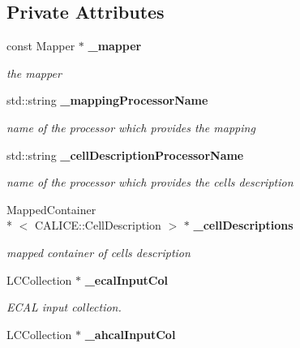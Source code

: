 \subsection*{Private Attributes}
\begin{DoxyCompactItemize}
\item 
const Mapper $\ast$ {\bf \-\_\-mapper}\label{classCALICE_1_1MipTrackFinder_af8ea6a3ae97f2df24592e914ff613203}

\begin{DoxyCompactList}\small\item\em the mapper \end{DoxyCompactList}\item 
std\-::string {\bf \-\_\-mapping\-Processor\-Name}\label{classCALICE_1_1MipTrackFinder_a19a0560f8d46d6669b10f253f21f6e7a}

\begin{DoxyCompactList}\small\item\em name of the processor which provides the mapping \end{DoxyCompactList}\item 
std\-::string {\bf \-\_\-cell\-Description\-Processor\-Name}\label{classCALICE_1_1MipTrackFinder_a6df4ecb6db21429aefd2900cdc1e4fb7}

\begin{DoxyCompactList}\small\item\em name of the processor which provides the cells description \end{DoxyCompactList}\item 
Mapped\-Container\\*
$<$ C\-A\-L\-I\-C\-E\-::\-Cell\-Description $>$ $\ast$ {\bf \-\_\-cell\-Descriptions}\label{classCALICE_1_1MipTrackFinder_aefbda6dfe51dc6bcfc5c1e33da66f9cc}

\begin{DoxyCompactList}\small\item\em mapped container of cells description \end{DoxyCompactList}\item 
L\-C\-Collection $\ast$ {\bf \-\_\-ecal\-Input\-Col}\label{classCALICE_1_1MipTrackFinder_aad63fbdc5a30192ec5cf167513b9ad42}

\begin{DoxyCompactList}\small\item\em E\-C\-A\-L input collection. \end{DoxyCompactList}\item 
L\-C\-Collection $\ast$ {\bf \-\_\-ahcal\-Input\-Col}\label{classCALICE_1_1MipTrackFinder_a0d088912057e75d9f714e10618e45a64}


\end{DoxyCompactItemize}
